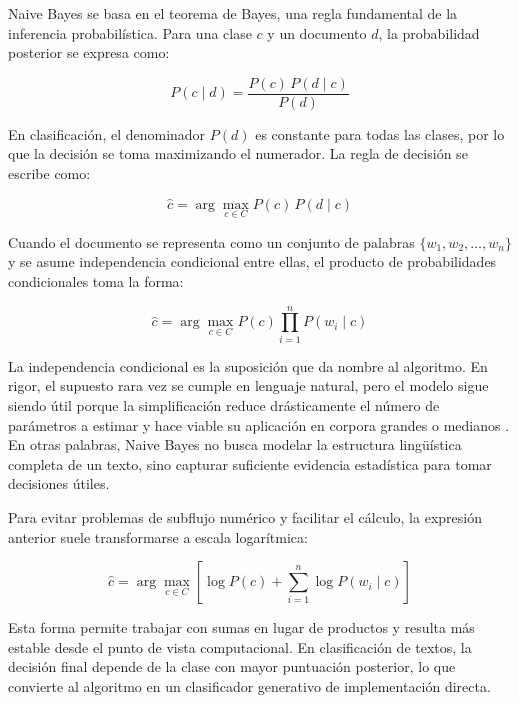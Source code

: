 Naive Bayes se basa en el teorema de Bayes, una regla fundamental de la inferencia probabilística. Para una clase $c$ y un documento $d$, la probabilidad posterior se expresa como:

\begin{equation}
P(c \mid d) = \frac{P(c)\,P(d \mid c)}{P(d)}
\label{eq:bayes}
\end{equation}

En clasificación, el denominador $P(d)$ es constante para todas las clases, por lo que la decisión se toma maximizando el numerador. La regla de decisión se escribe como:

\begin{equation}
\hat{c} = \arg\max_{c \in C} P(c)\,P(d \mid c)
\label{eq:decision}
\end{equation}

Cuando el documento se representa como un conjunto de palabras $\{w_1, w_2, \dots, w_n\}$ y se asume independencia condicional entre ellas, el producto de probabilidades condicionales toma la forma:

\begin{equation}
\hat{c} = \arg\max_{c \in C} P(c)\prod_{i=1}^{n}P(w_i \mid c)
\label{eq:naive}
\end{equation}

La independencia condicional es la suposición que da nombre al algoritmo. En rigor, el supuesto rara vez se cumple en lenguaje natural, pero el modelo sigue siendo útil porque la simplificación reduce drásticamente el número de parámetros a estimar y hace viable su aplicación en corpora grandes o medianos \cite{Kibriya2005,Frank2006}. En otras palabras, Naive Bayes no busca modelar la estructura lingüística completa de un texto, sino capturar suficiente evidencia estadística para tomar decisiones útiles.

Para evitar problemas de subflujo numérico y facilitar el cálculo, la expresión anterior suele transformarse a escala logarítmica:

\begin{equation}
\hat{c} = \arg\max_{c \in C} \left[\log P(c) + \sum_{i=1}^{n}\log P(w_i \mid c)\right]
\label{eq:logdecision}
\end{equation}

Esta forma permite trabajar con sumas en lugar de productos y resulta más estable desde el punto de vista computacional. En clasificación de textos, la decisión final depende de la clase con mayor puntuación posterior, lo que convierte al algoritmo en un clasificador generativo de implementación directa.

